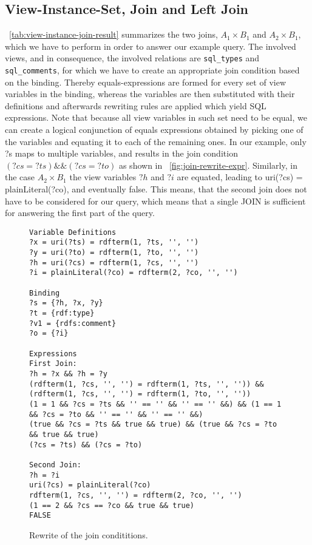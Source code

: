 \documentclass[a4paper,twoside,bibtotoc,abstracton,12pt,BCOR=15mm]{scrreprt}
\begin{document}
\subsection{View-Instance-Set, Join and Left Join}
~\autoref{tab:view-instance-join-result} summarizes the two joins, $A_1 \times B_1$ and $A_2 \times B_1$, which we have to perform in order to answer our example query.
The involved views, and in consequence, the involved relations are \texttt{sql\_types} and \texttt{sql\_comments}, for which we have to create an appropriate join condition
based on the binding.
Thereby equals-expressions are formed for every set of view variables in the binding, whereas the variables are then substituted with their definitions and afterwards rewriting rules are
applied which yield SQL expressions.
Note that because all view variables in such set need to be equal,
we can create a logical conjunction of equals expressions obtained by
picking one of the variables and equating it to each of the remaining ones.
In our example, only ?s maps to multiple variables, and results in the join condition $(?cs = ?ts) \&\& (?cs = ?to)$ as shown in ~\autoref{fig:join-rewrite-expr}. 
Similarly, in the case $A_2 \times B_1$ the view variables $?h$ and $?i$ are equated, leading to uri(?cs) = plainLiteral(?co), and eventually false.
This means, that the second join does not have to be considered for our query, which means that a single JOIN is sufficient for answering the
first part of the query.

\begin{figure}
\begin{verbatim}
Variable Definitions
?x = uri(?ts) = rdfterm(1, ?ts, '', '')
?y = uri(?to) = rdfterm(1, ?to, '', '')
?h = uri(?cs) = rdfterm(1, ?cs, '', '')
?i = plainLiteral(?co) = rdfterm(2, ?co, '', '')

Binding
?s = {?h, ?x, ?y} 
?t = {rdf:type} 
?v1 = {rdfs:comment} 
?o = {?i} 

Expressions
First Join:
?h = ?x && ?h = ?y
(rdfterm(1, ?cs, '', '') = rdfterm(1, ?ts, '', '')) && (rdfterm(1, ?cs, '', '') = rdfterm(1, ?to, '', ''))
(1 = 1 && ?cs = ?ts && '' == '' && '' == '' &&) && (1 == 1 && ?cs = ?to && '' == '' && '' == '' &&)
(true && ?cs = ?ts && true && true) && (true && ?cs = ?to && true && true)
(?cs = ?ts) && (?cs = ?to)

Second Join:
?h = ?i
uri(?cs) = plainLiteral(?co)
rdfterm(1, ?cs, '', '') = rdfterm(2, ?co, '', '')
(1 == 2 && ?cs == ?co && true && true) 
FALSE

\end{verbatim}
\caption{Rewrite of the join condititions.}
\label{fig:join-rewrite-expr}
\end{figure}
\end{document}
